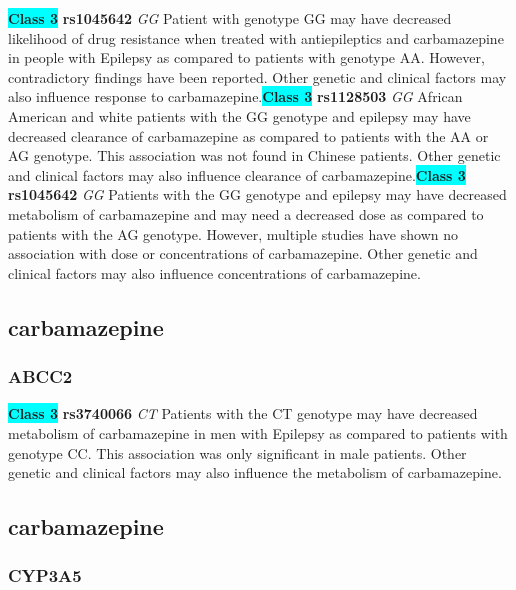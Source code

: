 \documentclass{book}
\begin{document}
\begin{center}
\textbf{\colorbox{cyan} {Class 3}} \textbf{ rs1045642 } \textit{ GG }
Patient with genotype GG may have decreased likelihood of drug resistance when treated with antiepileptics and carbamazepine in people with Epilepsy as compared to patients with genotype AA. However, contradictory findings have been reported. Other genetic and clinical factors may also influence response to carbamazepine.\textbf{\colorbox{cyan} {Class 3}} \textbf{ rs1128503 } \textit{ GG }
African American and white patients with the GG genotype and epilepsy may have decreased clearance of carbamazepine as compared to patients with the AA or AG genotype. This association was not found in Chinese patients. Other genetic and clinical factors may also influence clearance of carbamazepine.\textbf{\colorbox{cyan} {Class 3}} \textbf{ rs1045642 } \textit{ GG }
Patients with the GG genotype and epilepsy may have decreased metabolism of carbamazepine and may need a decreased dose as compared to patients with the AG genotype. However, multiple studies have shown no association with dose or concentrations of carbamazepine. Other genetic and clinical factors may also influence concentrations of carbamazepine.


\end{center}\subsection{ carbamazepine }


\subsubsection{ ABCC2 }

\begin{center}
\textbf{\colorbox{cyan} {Class 3}} \textbf{ rs3740066 } \textit{ CT }
Patients with the CT genotype may have decreased metabolism of carbamazepine in men with Epilepsy as compared to patients with genotype CC. This association was only significant in male patients. Other genetic and clinical factors may also influence the metabolism of carbamazepine.


\end{center}\subsection{ carbamazepine }


\subsubsection{ CYP3A5 }
\end{document}
